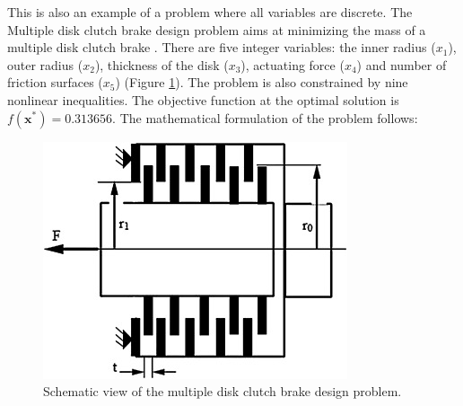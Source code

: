 

This is also an example of a problem where all variables are discrete. The Multiple disk clutch brake design problem aims at minimizing the mass of a multiple disk clutch brake \cite{MD}. There are five integer variables: the inner radius ($x_1$), outer radius ($x_2$), thickness of the disk ($x_3$), actuating force ($x_4$) and number of friction surfaces ($x_5$) (Figure \ref{fig:MD}). The problem is also constrained by nine nonlinear inequalities. The objective function at the optimal solution is $f(\bm{x}^*) = 0.313656$. The mathematical formulation of the problem follows:

\vspace{-0.5cm}



\vspace{0.5cm}


\begin{figure}[h]
    \begin{center}
    \includegraphics[scale=0.6]{img/Problems/MD.jpg}
    \end{center}
    \captionsetup{justification=centering}
    \caption{Schematic view of the multiple disk clutch brake design problem.}\label{fig:MD}
\end{figure}